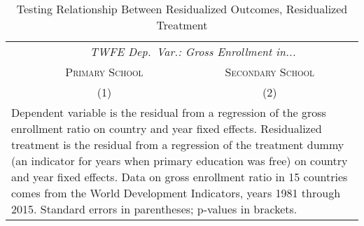 \documentclass[11pt]{article}
\begin{document}
\begin{table}[h]
	\begin{center}
		\caption{Testing Relationship Between Residualized Outcomes, Residualized Treatment} \label{tab:residregs}
		
		\medskip
		
		\begingroup
		\setlength{\tabcolsep}{6pt} %
		\renewcommand{\arraystretch}{1.4} %
		\begin{tabular}{lcc} 
			\multicolumn{1}{p{4.0cm}}{} & \multicolumn{1}{p{4.0cm}}{} & \multicolumn{1}{p{4.0cm}}{} \\	
			\hline \hline 	
			& \multicolumn{2}{c}{\emph{TWFE Dep.~Var.:  Gross Enrollment in...}} \\ 
			& \textsc{Primary School} & \textsc{Secondary School} \\ 
			& (1) & (2) \\ 
			\hline
			
			\hline
			\multicolumn{3}{p{15.1cm}}{\footnotesize{Dependent variable is the residual from a regression of the gross enrollment ratio on country and year fixed effects.  Residualized treatment is the residual from a regression of the treatment dummy (an indicator for years when primary education was free) on country and year fixed effects.  Data on gross enrollment ratio in 15 countries comes from the World Development Indicators, years 1981 through 2015.  Standard errors in parentheses; p-values in brackets.}} \\
		\end{tabular}
		\endgroup
	\end{center}
\end{table}

\clearpage
\end{document}
